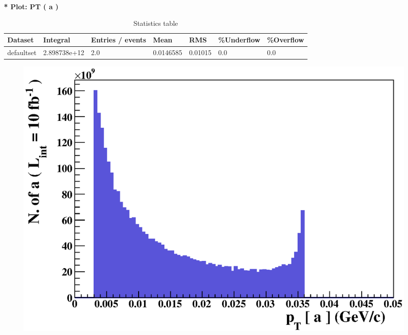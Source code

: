 \documentclass[a4paper, 11pt]{article}
\begin{document}
   \textbf{   * Plot: PT ( a ) }
\textbf{ }\begin{table}[!h]
  \begin{center}
    \caption{ Statistics table}
    \begin{tabular}{|m{17.0mm}|m{27.0mm}|m{23.0mm}|m{18.0mm}|m{18.0mm}|m{14.0mm}|m{14.0mm}|}
      \hline
      \cellcolor{yellow}         Dataset& \cellcolor{yellow}         Integral& \cellcolor{yellow}         Entries /\- events& \cellcolor{yellow}         Mean& \cellcolor{yellow}         RMS& \cellcolor{yellow}         \%Underflow& \cellcolor{yellow}         \%Overflow\\
      \hline
      \cellcolor{white}         defaultset& \cellcolor{white}         2.898738e+12& \cellcolor{white}         2.0& \cellcolor{white}         0.0146585& \cellcolor{white}         0.01015& \cellcolor{green}         0.0& \cellcolor{green}         0.0\\
\hline
    \end{tabular}
  \end{center}
\end{table}

\begin{figure}[!h]
  \begin{center}
    \includegraphics[scale=0.6]{selection_4.eps}\\
\caption{}
  \end{center}
\end{figure}
\newpage
   
\end{document}
